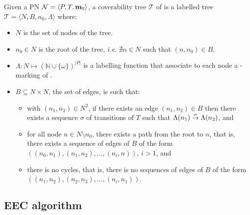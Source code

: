 \begin{defi}
  Given a \ac{PN} $\mathcal{N} = \langle P,T, \mathbf{m}_0\rangle$, a coverability tree $\mathcal{T}$ of \tupleN is a labelled tree $\mathcal{T} = \langle N, B, n_0, \Lambda\rangle$ where:
  \begin{itemize}
    \item $N$ is the set of nodes of the tree.%
    \item $n_0 \in N$ is the root of the tree, \textit{i.e.} $\nexists n \in N$ such that $(n, n_0) \in B$.
    \item $\Lambda : N \mapsto (\mathbb{N} \cup \{\omega\})^{|P|}$ is a labelling function that associate to each node a \textomega-marking of \tupleN.
    \item $B \subseteq N \times N$, the set of edges, is such that:
      \begin{itemize}
        \item with $(n_1, n_2) \in N^2$, if there exists an edge $(n_1, n_2) \in B$ then there exists a sequence $\sigma$ of transitions of $T$ such that $\Lambda(n_1) \stackrel{\sigma}{\to} \Lambda(n_2)$, and
        \item for all node $n \in N \setminus n_0$, there exists a path from the root to $n$, that is, there exists a sequence of edges of $B$ of the form $((n_0, n_1), (n_1, n_2), \dots, (n_{i}, n))$, $i > 1$, and
        \item there is no cycles, that is, there is no sequences of edges of $B$ of the form $((n_1, n_2), (n_2, n_3), \dots, (n_i, n_1))$.
      \end{itemize}
  \end{itemize}
\end{defi}


\subsection{\ac{EEC} algorithm}
\label{sec:ecc}

\citep{Geeraerts07thesis, Geeraerts06}

